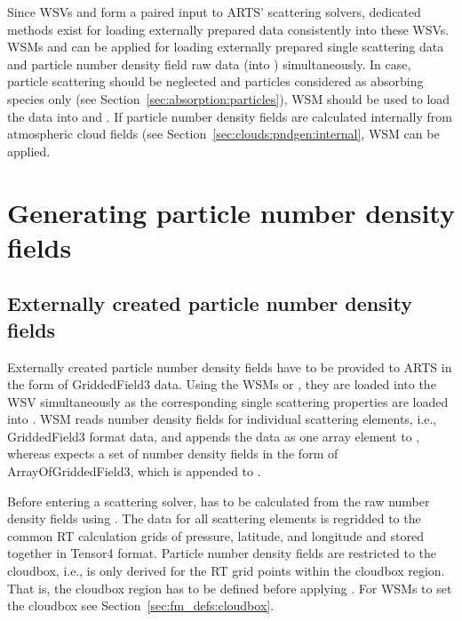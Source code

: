 Since WSVs  and  form a paired
input to ARTS' scattering solvers, dedicated methods exist for loading
externally prepared data consistently into these WSVs. WSMs
 and  can
be applied for loading externally prepared single scattering data and particle
number density field raw data (into ) simultaneously.
In case, particle scattering should be neglected and particles considered as
absorbing species only (see Section~\ref{sec:absorption:particles}), WSM
 should be used to load the data into
 and . If particle number
density fields are calculated internally from atmospheric cloud fields (see
Section~\ref{sec:clouds:pndgen:internal}, WSM
 can be applied.


\section{Generating particle number density fields}
\label{sec:clouds:pndgen}

\subsection{Externally created particle number density fields}
\label{sec:clouds:pndgen:external}
Externally created particle number density fields have to be provided to ARTS in
the form of GriddedField3 data. Using the WSMs
 or ,
they are loaded into the WSV  simultaneously as the
corresponding single scattering properties are loaded into
. WSM  reads number
density fields for individual scattering elements, i.e., GriddedField3 format
data, and appends the data as one array element to ,
whereas  expects a set of number density
fields in the form of ArrayOfGriddedField3, which is appended to
.

Before entering a scattering solver,  has to be calculated
from the raw number density fields using
. The data for all scattering
elements is regridded to the common RT calculation grids of pressure, latitude, and
longitude and stored together in Tensor4 format. Particle number density fields
are restricted to the cloudbox, i.e.,  is only derived
for the RT grid points within the cloudbox region. That is, the cloudbox region
has to be defined before applying
. For WSMs to set the cloudbox see
Section~\ref{sec:fm_defs:cloudbox}.

